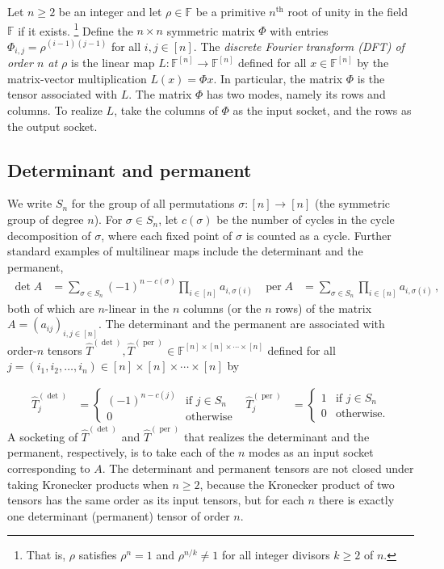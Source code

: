 \documentclass[11pt]{article}
\numberwithin{equation}{section}
\theoremstyle{definition}
\theoremstyle{plain}
\newcommand{\per}{\ensuremath{\operatorname{per}}}
\newcommand{\F}{\ensuremath{\mathbb{F}}}
\begin{document}
Let $n\geq 2$ be an integer and let $\rho\in\F$ be a primitive
$n^\text{th}$ root of unity in the field $\F$ if it exists.%
\footnote{That is, $\rho$ satisfies $\rho^n=1$ and $\rho^{n/k}\neq 1$
for all integer divisors $k\geq 2$ of $n$.}{}
Define the $n\times n$ symmetric matrix $\Phi$ with
entries $\Phi_{i,j}=\rho^{(i-1)(j-1)}$ for all $i,j\in [n]$.
The \emph{discrete Fourier transform (DFT) of order $n$ at $\rho$} is the
linear map $L:\F^{[n]}\rightarrow \F^{[n]}$ defined for all $x\in\F^{[n]}$
by the matrix-vector multiplication $L(x)=\Phi x$.
In particular, the matrix $\Phi$ is the tensor
associated with $L$. The matrix $\Phi$ has two modes,
namely its rows and columns.
To realize $L$, take the columns of $\Phi$ as the input socket, and the rows
as the output socket.

\subsection{Determinant and permanent}

%
%
We   %
write $S_n$ for the %
%
group of all permutations
$\sigma:[n]\rightarrow [n]$
(the symmetric group of degree $n$).  %
For $\sigma \in S_n$, let $c(\sigma)$ be the number of
cycles in the cycle decomposition of $\sigma$,
where each fixed point of $\sigma$ is counted as a cycle.
Further standard examples of multilinear %
%
%
maps
%
include the determinant and
the  %
permanent,  %
\begin{align}
\label{eq:det and per}
\det A &=
\sum_{\sigma\in S_n}(-1)^{n-c(\sigma)}\prod_{i\in[n]}a_{i,\sigma(i)} &
\per A &=
\sum_{\sigma\in S_n}\prod_{i\in[n]}a_{i,\sigma(i)}\,,
\end{align}
both of which are $n$-linear in the $n$ columns (or the $n$ rows) of the
matrix $A=(a_{ij})_{i,j\in[n]}$.
The determinant and 
the  %
permanent are associated with order-$n$  %
tensors
$\hat{T}^{(\det)}, \hat{T}^{(\per)} \in \F^{[n] \times [n] \times \cdots \times [n]}$
defined for all $j = (i_1,i_2,\ldots,i_n) \in [n] \times [n] \times \cdots \times [n]$ by

\begin{align}
\label{tensor:det}
\hat{T}^{(\det)}_{j}&=
\begin{cases}
(-1)^{n-c(j)} & \text{if } j \in S_n\\
0 & \text{otherwise}
\end{cases} &
\hat{T}^{(\per)}_{j}&=
\begin{cases}
1 & \text{if } j \in S_n\\
0 & \text{otherwise}.
\end{cases}
\end{align}
A socketing of $\hat{T}^{(\det)}$ and $\hat{T}^{(\per)}$ that realizes the determinant and
the  %
permanent, respectively, is to take each of the $n$ modes as an input socket corresponding to $A$.
%
The determinant and permanent tensors are not closed under taking Kronecker products when $n \geq 2$, because the Kronecker product of two tensors has the same order as its input tensors, 
%
%
%
but for each $n$ there is exactly one determinant (permanent) tensor of order $n$.
\end{document}
